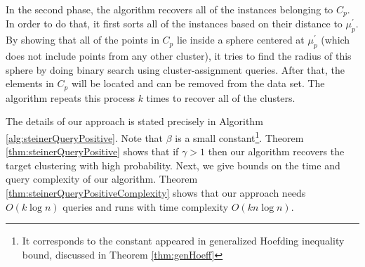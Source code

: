 \documentclass[orivec]{llncs}
\begin{document}
In the second phase, the algorithm recovers all of the instances belonging to $C_p$. In order to do that, it first sorts all of the instances based on their distance to $\mu_p^\prime$. By showing that all of the points in $C_p$ lie inside a sphere centered at $\mu_p^\prime$ (which does not include points from any other cluster), it tries to find the radius of this sphere by doing binary search using cluster-assignment queries. After that, the elements in $C_p$ will be located and can be removed from the data set. The algorithm repeats this process $k$ times to recover all of the clusters.



The details of our approach is stated precisely in Algorithm \ref{alg:steinerQueryPositive}. Note that $\beta$ is a small constant\footnote{It corresponds to the constant appeared in generalized Hoefding inequality bound, discussed in Theorem \ref{thm:genHoeff}}. Theorem \ref{thm:steinerQueryPositive} shows that if $\gamma > 1$ then our algorithm recovers the target clustering with high probability. Next, we give bounds on the time and query complexity of our algorithm. Theorem \ref{thm:steinerQueryPositiveComplexity} shows that our approach needs $O(k\log n)$ queries and runs with time complexity $O(kn\log n)$.
\end{document}
